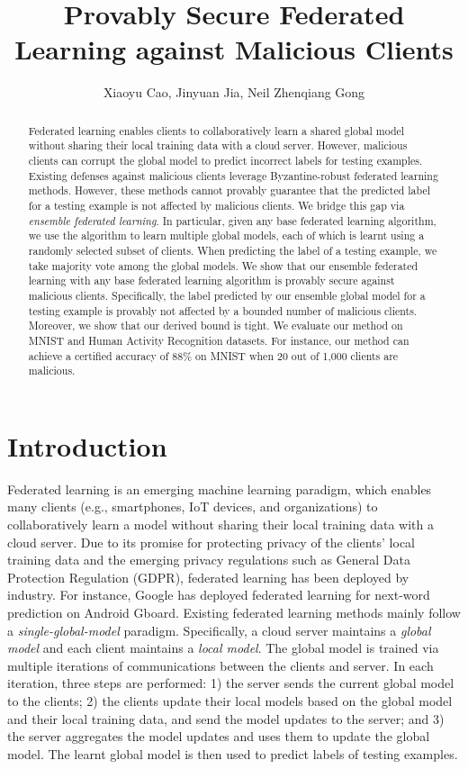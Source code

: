 \documentclass[letterpaper]{article} %
\title{Provably Secure Federated Learning against Malicious Clients}
\author{
Xiaoyu Cao,
Jinyuan Jia,
Neil Zhenqiang Gong \\
}
\begin{document}
\maketitle



\begin{abstract}
Federated learning enables clients to collaboratively learn a shared global model without sharing their local training data with a cloud server. However, malicious clients can corrupt the global model to predict incorrect labels for testing examples. Existing defenses against malicious clients leverage Byzantine-robust federated learning methods. However, these methods cannot provably guarantee that the predicted label for a testing example is  not affected by malicious clients.  We bridge this gap via \emph{ensemble federated learning}.  In particular, given any base federated learning algorithm, we use the algorithm to learn multiple global models, each of which is learnt using a randomly selected subset of clients. When predicting the label of a testing example, we take majority vote among the  global models. We show that our ensemble federated learning with any base federated learning algorithm is provably secure against malicious clients. Specifically, the label predicted by our ensemble global model for a testing example is provably not affected by a bounded number of malicious clients. Moreover, we show that our derived bound is tight. We evaluate our method on MNIST and Human Activity Recognition datasets. For instance, our method can achieve a certified accuracy of 88\% on MNIST when 20 out of 1,000 clients are malicious.
\end{abstract}


\section{Introduction}

Federated learning \cite{konevcny2016federated,mcmahan2016communication} is an emerging machine learning paradigm, which enables many clients (e.g., smartphones, IoT devices, and organizations) to collaboratively learn a model without sharing their local training data with a cloud server. Due to its promise for protecting privacy of the clients' local training data and the emerging privacy regulations such as General Data Protection Regulation (GDPR), federated learning has been deployed by industry. For instance, Google has deployed  federated learning for next-word prediction on Android Gboard.  Existing federated learning methods mainly follow a \emph{single-global-model} paradigm.  Specifically, a cloud server maintains a \emph{global model} and each client maintains a \emph{local model}.  The global model is trained via multiple iterations of communications between the clients and server. In each iteration, three steps are performed: 1) the server sends the current global model to the clients; 2) the clients update their local models based on the global model and their local training data, and send the model updates to the server; and 3) the server aggregates the model updates and uses them to update the global model. The learnt global model is then used to predict labels of testing examples.
\end{document}
